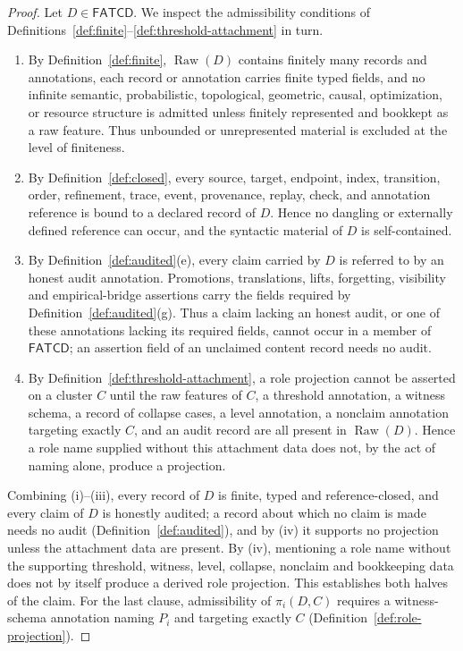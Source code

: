 \documentclass[11pt]{article}
\theoremstyle{definition}
\newcommand{\FATCD}{\ensuremath{\mathsf{FATCD}}}
\newcommand{\Raw}[1]{\ensuremath{\operatorname{Raw}\!\left(#1\right)}}
\begin{document}
\begin{proof}
Let \(D \in \FATCD{}\). We inspect the admissibility conditions of
Definitions~\ref{def:finite}--\ref{def:threshold-attachment} in turn.
\begin{enumerate}[label=(\roman*),topsep=2pt,itemsep=1pt]
  \item By Definition~\ref{def:finite}, \(\Raw{D}\) contains finitely many
    records and annotations, each record or annotation carries finite typed
    fields, and no infinite semantic, probabilistic, topological, geometric,
    causal, optimization, or resource structure is admitted unless finitely
    represented and bookkept as a raw feature. Thus unbounded or
    unrepresented material is excluded at the level of finiteness.
  \item By Definition~\ref{def:closed}, every source, target, endpoint,
    index, transition, order, refinement, trace, event, provenance, replay,
    check, and annotation reference is bound to a declared record of \(D\).
    Hence no dangling or externally defined reference can occur, and the
    syntactic material of \(D\) is self-contained.
  \item By Definition~\ref{def:audited}(e), every claim carried by \(D\)
    is referred to by an honest audit annotation. Promotions, translations,
    lifts, forgetting, visibility and empirical-bridge assertions carry the
    fields required by Definition~\ref{def:audited}(g). Thus a claim lacking
    an honest audit, or one of these annotations lacking its required
    fields, cannot occur in a member of \FATCD{}; an assertion field of an
    unclaimed content record needs no audit.
  \item By Definition~\ref{def:threshold-attachment}, a role projection
    cannot be asserted on a cluster \(C\) until the raw features of \(C\), a
    threshold annotation, a witness schema, a record of collapse cases, a
    level annotation, a nonclaim annotation targeting exactly \(C\), and an
    audit record are all present in \(\Raw{D}\).
    Hence a role name supplied without this attachment data does not, by the
    act of naming alone, produce a projection.
\end{enumerate}
Combining (i)--(iii), every record of \(D\) is finite, typed and
reference-closed, and every claim of \(D\) is honestly audited; a record about
which no claim is made needs no audit (Definition~\ref{def:audited}), and by
(iv) it supports no projection unless the attachment data are present. By (iv), mentioning a role name without the supporting
threshold, witness, level, collapse, nonclaim and bookkeeping data does not by itself
produce a derived role projection. This establishes both halves of the
claim. For the last clause, admissibility of \(\pi_i(D,C)\) requires a
witness-schema annotation naming \(P_i\) and targeting exactly \(C\)
(Definition~\ref{def:role-projection}).
\end{proof}
\end{document}
